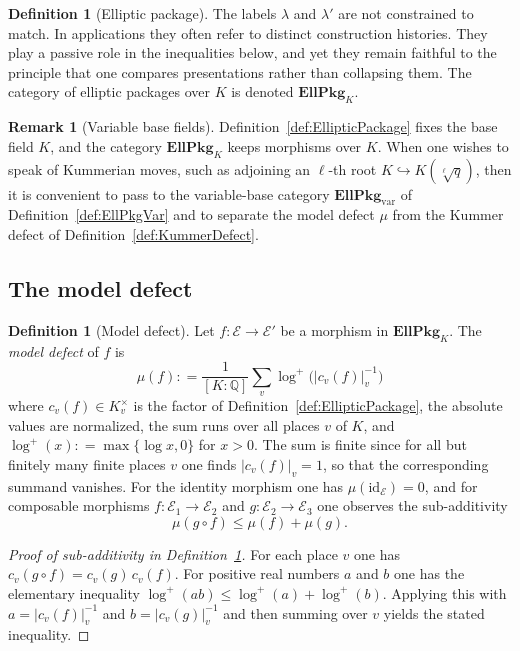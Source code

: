 \documentclass[10pt, reqno]{amsart}
\theoremstyle{plain}
\theoremstyle{definition}
\newtheorem{definition}[theorem]{Definition}
\newtheorem{remark}[theorem]{Remark}
\theoremstyle{plain}
\newcommand{\Q}{\mathbb{Q}}
\newcommand{\coloneqq}{\mathrel{\mathop:}=}
\begin{document}
\begin{definition}[Elliptic package]
The labels $\lambda$ and $\lambda'$ are not constrained to match. In applications they often refer to distinct construction histories. They play a passive role in the inequalities below, and yet they remain faithful to the principle that one compares presentations rather than collapsing them. The category of elliptic packages over $K$ is denoted $\mathbf{EllPkg}_K$.
\end{definition}

\begin{remark}[Variable base fields]\label{rem:EllPkgVarCrossRef}
Definition~\ref{def:EllipticPackage} fixes the base field $K$, and the category $\mathbf{EllPkg}_K$ keeps morphisms over $K$. When one wishes to speak of Kummerian moves, such as adjoining an $\ell$-th root $K \hookrightarrow K(\sqrt[\ell]{q})$, then it is convenient to pass to the variable-base category $\mathbf{EllPkg}_{\mathrm{var}}$ of Definition~\ref{def:EllPkgVar} and to separate the model defect $\mu$ from the Kummer defect of Definition~\ref{def:KummerDefect}.
\end{remark}

\subsection{The model defect}\label{subsec:ModelDefect}

\begin{definition}[Model defect]\label{def:ModelDefect}
Let $f \colon \mathcal{E} \to \mathcal{E}'$ be a morphism in $\mathbf{EllPkg}_K$. The \emph{model defect} of $f$ is
\[
\mu(f) \coloneqq \frac{1}{[K:\Q]} \sum_{v} \log^{+}\!\bigl(\lvert c_v(f)\rvert_v^{-1}\bigr)
\]
where $c_v(f) \in K_v^\times$ is the factor of Definition~\ref{def:EllipticPackage}, the absolute values are normalized, the sum runs over all places $v$ of $K$, and $\log^{+}(x) \coloneqq \max\{\log x,0\}$ for $x>0$. The sum is finite since for all but finitely many finite places $v$ one finds $\lvert c_v(f)\rvert_v = 1$, so that the corresponding summand vanishes. For the identity morphism one has $\mu(\mathrm{id}_{\mathcal{E}}) = 0$, and for composable morphisms $f \colon \mathcal{E}_1 \to \mathcal{E}_2$ and $g \colon \mathcal{E}_2 \to \mathcal{E}_3$ one observes the sub-additivity
\[
\mu(g \circ f) \le \mu(f) + \mu(g).
\]
\end{definition}

\begin{proof}[Proof of sub-additivity in Definition~\ref{def:ModelDefect}]
For each place $v$ one has $c_v(g \circ f) = c_v(g)\,c_v(f)$. For positive real numbers $a$ and $b$ one has the elementary inequality $\log^{+}(ab) \le \log^{+}(a) + \log^{+}(b)$. Applying this with $a = \lvert c_v(f)\rvert_v^{-1}$ and $b = \lvert c_v(g)\rvert_v^{-1}$ and then summing over $v$ yields the stated inequality.
\end{proof}
\end{document}
